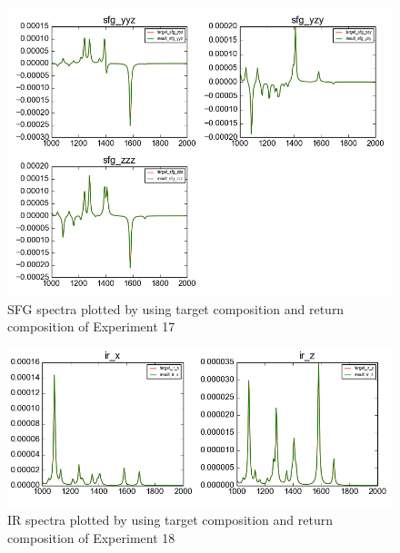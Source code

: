 \begin{figure}[!ht] \label{fig:4.4}
\centering
\includegraphics[scale=0.5]{Figures/chapter4_result_target_plotting_5datapoint_sfg.png}
\caption{SFG spectra plotted by using target composition and return composition of Experiment 17} 
\end{figure}

\begin{figure}[!ht] \label{fig:4.5}
\centering
\includegraphics[scale=0.5]{Figures/chapter4_result_target_plotting_500datapoint_ir.png}
\caption{IR spectra plotted by using target composition and return composition of Experiment 18} 
\end{figure}

